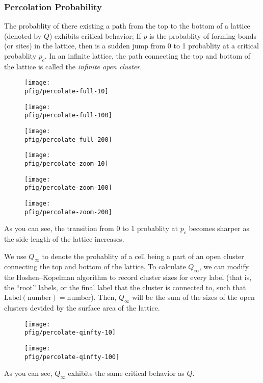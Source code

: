 \documentclass[12pt,a4paper]{article}
\newcommand{\pfig}{../fig/percolation}
\begin{document}
    \subsubsection{Percolation Probability}
    The probablity of there existing a path from the top to the bottom of a lattice (denoted by $Q$) exhibits critical
    behavior; If $p$ is the probablity of forming bonds (or sites) in the lattice, then is a sudden jump from 0 to 1
    probablity at a critical probablity $p_c$. In an infinite lattice, the path connecting the top and bottom of
    the lattice is called the \emph{infinite open cluster}.

    \begin{figure}
        \centering
        \texttt{[image: \\pfig/percolate-full-10]}
    \end{figure}
    \begin{figure}
        \centering
        \texttt{[image: \\pfig/percolate-full-100]}
    \end{figure}
    \begin{figure}
        \centering
        \texttt{[image: \\pfig/percolate-full-200]}
    \end{figure}
    \begin{figure}
        \centering
        \texttt{[image: \\pfig/percolate-zoom-10]}
    \end{figure}
    \begin{figure}
        \centering
        \texttt{[image: \\pfig/percolate-zoom-100]}
    \end{figure}
    \begin{figure}
        \centering
        \texttt{[image: \\pfig/percolate-zoom-200]}
    \end{figure}

    As you can see, the transition from 0 to 1 probablity at $p_c$ becomes sharper as the side-length of the lattice
    increases.

    We use $Q_\infty$ to denote the probablity of a cell being a part of an open cluster connecting the top and bottom
    of the lattice. To calculate $Q_\infty$, we can modify the Hoshen--Kopelman algorithm to record cluster sizes for
    every label (that is, the \enquote{root} labels, or the final label that the cluster is connected to, such that
    $\mathrm{Label(number) = number}$). Then, $Q_\infty$ will be the sum of the sizes of the open clusters devided by
    the surface area of the lattice.

    \begin{figure}
        \centering
        \texttt{[image: \\pfig/percolate-qinfty-10]}
    \end{figure}
    \begin{figure}
        \centering
        \texttt{[image: \\pfig/percolate-qinfty-100]}
    \end{figure}

    As you can see, $Q_\infty$ exhibits the same critical behavior as $Q$.
\end{document}
